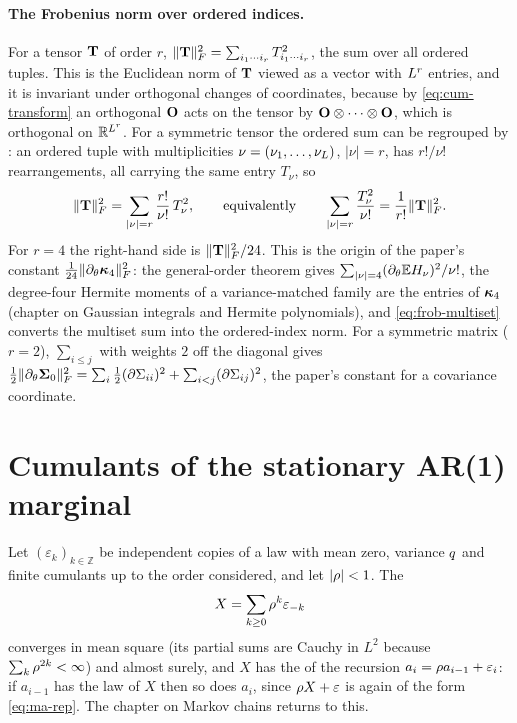 \paragraph{The Frobenius norm over ordered indices.}
For a tensor $\mathbf{T}$ of order $r$, $\lVert \mathbf{T} \rVert_{F}^2=\sum_{i_1\cdots i_r}T_{i_1\cdots i_r}^2$,
the sum over all ordered tuples. This is the Euclidean norm of $\mathbf{T}$ viewed as a
vector with $L^r$ entries, and it is invariant under orthogonal changes of
coordinates, because by \cref{eq:cum-transform} an orthogonal $\mathbf{O}$ acts on the
tensor by $\mathbf{O}\otimes\cdots\otimes\mathbf{O}$, which is orthogonal on $\mathbb{R}^{L^r}$.
For a symmetric tensor the ordered sum can be regrouped by : an ordered
tuple with multiplicities $\nu=(\nu_1,\dots,\nu_{L})$, $|\nu|=r$, has $r!/\nu!$
rearrangements, all carrying the same entry $T_\nu$, so
\begin{equation}
  \lVert \mathbf{T} \rVert_{F}^2=\sum_{|\nu|=r}\frac{r!}{\nu!}\,T_\nu^2,
  \qquad\text{equivalently}\qquad
  \sum_{|\nu|=r}\frac{T_\nu^2}{\nu!}=\frac{1}{r!}\lVert \mathbf{T} \rVert_{F}^2.
  \label{eq:frob-multiset}
\end{equation}
For $r=4$ the right-hand side is $\lVert \mathbf{T} \rVert_{F}^2/24$. This is the origin of the paper's
constant $\tfrac1{24}\lVert \partial_\theta\bm{\kappa}_4 \rVert_{F}^2$: the general-order theorem gives
$\sum_{|\nu|=4}(\partial_\theta\mathbb{E} H_\nu)^2/\nu!$, the degree-four Hermite moments of a
variance-matched family are the entries of $\bm{\kappa}_4$ (chapter on Gaussian integrals and
Hermite polynomials), and \cref{eq:frob-multiset} converts the multiset sum into the
ordered-index norm. For a symmetric matrix ($r=2$), $\sum_{i\le j}$ with weights
$2$ off the diagonal gives $\tfrac12\lVert \partial_\theta\mathbf{\Sigma}_0 \rVert_{F}^2=\sum_i\tfrac12(\partial\Sigma_{ii})^2+\sum_{i<j}(\partial\Sigma_{ij})^2$,
the paper's constant for a covariance coordinate.

\section{Cumulants of the stationary AR(1) marginal}
\label{sec:ar1-cumulants}

Let $(\varepsilon_k)_{k\in\mathbb Z}$ be independent copies of a law with mean zero,
variance $q$ and finite cumulants up to the order considered, and let $|\rho|<1$.
The 
\begin{equation}
  X=\sum_{k\ge0}\rho^k\varepsilon_{-k}
  \label{eq:ma-rep}
\end{equation}
converges in mean square (its partial sums are Cauchy in $L^2$ because
$\sum_k\rho^{2k}<\infty$) and almost surely, and $X$ has the  of
the recursion $a_i=\rho a_{i-1}+\varepsilon_i$: if $a_{i-1}$ has the law of $X$ then
so does $a_i$, since $\rho X+\varepsilon$ is again of the form \cref{eq:ma-rep}. The
chapter on Markov chains returns to this.

